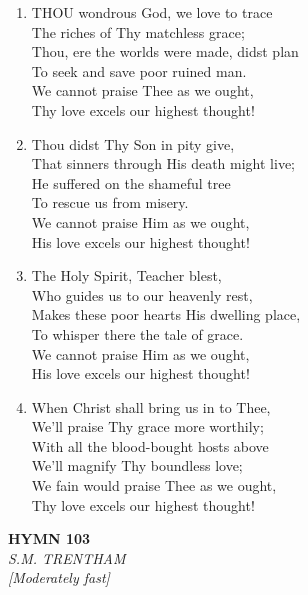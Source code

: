 \documentclass[11pt,a4paper]{article}
\begin{document}
\begin{enumerate}
    \item THOU wondrous God, we love to trace \\
        The riches of Thy matchless grace; \\
        Thou, ere the worlds were made, didst plan \\
        To seek and save poor ruined man. \\
        We cannot praise Thee as we ought, \\
        Thy love excels our highest thought!

    \item Thou didst Thy Son in pity give, \\
        That sinners through His death might live; \\
        He suffered on the shameful tree \\
        To rescue us from misery. \\
        We cannot praise Him as we ought, \\
        His love excels our highest thought!

    \item The Holy Spirit, Teacher blest, \\
        Who guides us to our heavenly rest, \\
        Makes these poor hearts His dwelling place, \\
        To whisper there the tale of grace. \\
        We cannot praise Him as we ought, \\
        His love excels our highest thought!

    \item When Christ shall bring us in to Thee, \\
        We'll praise Thy grace more worthily; \\
        With all the blood-bought hosts above \\
        We'll magnify Thy boundless love; \\
        We fain would praise Thee as we ought, \\
        Thy love excels our highest thought!

\end{enumerate}

\newpage
\begin{center}
    {\Large \textbf{HYMN 103}}
    \\
    \textit{S.M. TRENTHAM}
    \\
    \textit{\small [Moderately fast]}
\end{center}
\vspace{1em}
\end{document}
